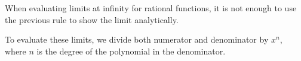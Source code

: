 \documentclass[cal1spr16Lectures.tex]{subfiles}
\begin{document}
\begin{frame}%
When evaluating limits at infinity for rational functions, it is not enough to use the previous rule to show the limit analytically.

\vspace{1pc}
To evaluate these limits, we divide both numerator and denominator by $x^n$, where $n$ is the degree of the polynomial in the denominator.
\end{frame}
\end{document}

